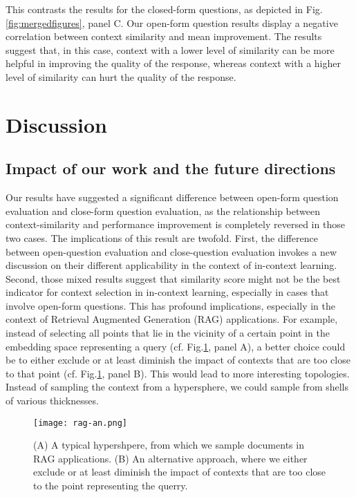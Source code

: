 \documentclass{article}
\begin{document}
    This contrasts the results for the closed-form questions, as depicted in Fig. \ref{fig:mergedfigures}, panel C. Our open-form question results display a negative correlation between context similarity and mean improvement. The results suggest that, in this case, context with a lower level of similarity can be more helpful in improving the quality of the response, whereas context with a higher level of similarity can hurt the quality of the response.

\section{Discussion}

\subsection{Impact of our work and the future directions}

    Our results have suggested a significant difference between open-form question evaluation and close-form question evaluation, as the relationship between context-similarity and performance improvement is completely reversed in those two cases. The implications of this result are twofold. First, the difference between open-question evaluation and close-question evaluation invokes a new discussion on their different applicability in the context of in-context learning. Second, those mixed results suggest that similarity score might not be the best indicator for context selection in in-context learning, especially in cases that involve open-form questions. This has profound implications, especially in the context of Retrieval Augmented Generation (RAG) applications.
    For example, instead of selecting all points that lie in the vicinity of a certain point in the embedding space representing a query (cf. Fig.\ref{fig:donut_rag}, panel A), a better choice could be to either exclude or at least diminish the impact of contexts that are too close to that point (cf. Fig.\ref{fig:donut_rag}, panel B). This would lead to more interesting topologies. Instead of sampling the context from a hypersphere, we could sample from shells of various thicknesses.
    

    \begin{figure}
        \centering
        \texttt{[image: rag-an.png]}
        \caption{(A) A typical hypershpere, from which we sample documents in RAG applications. (B) An alternative approach, where we either exclude or at least diminish the impact of contexts that are too close to the point representing the querry.}
        \label{fig:donut_rag}
    \end{figure}
\end{document}

